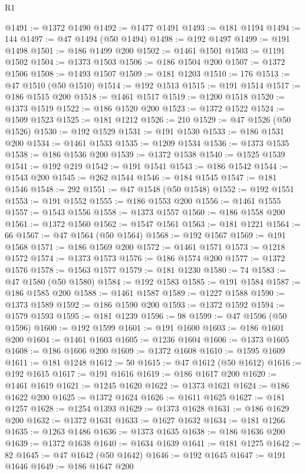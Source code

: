 \begin{lexlean}{R1}
\begin{coremodule}
@1491 := @1372 @1490
@1492 := @1477 @1491
@1493 := @181 @1194
@1494 := 144
@1497 := @47 @1494 (@50 @1494)
@1498 := @192 @1497
@1499 := @191 @1498
@1501 := @186 @1499 @200
@1502 := @1461 @1501
@1503 := @1191 @1502
@1504 := @1373 @1503
@1506 := @186 @1504 @200
@1507 := @1372 @1506
@1508 := @1493 @1507
@1509 := @181 @1203
@1510 := 176
@1513 := @47 @1510 (@50 @1510)
@1514 := @192 @1513
@1515 := @191 @1514
@1517 := @186 @1515 @200
@1518 := @1461 @1517
@1519 := @1200 @1518
@1520 := @1373 @1519
@1522 := @186 @1520 @200
@1523 := @1372 @1522
@1524 := @1509 @1523
@1525 := @181 @1212
@1526 := 210
@1529 := @47 @1526 (@50 @1526)
@1530 := @192 @1529
@1531 := @191 @1530
@1533 := @186 @1531 @200
@1534 := @1461 @1533
@1535 := @1209 @1534
@1536 := @1373 @1535
@1538 := @186 @1536 @200
@1539 := @1372 @1538
@1540 := @1525 @1539
@1541 := @192 @219
@1542 := @191 @1541
@1543 := @186 @1542
@1544 := @1543 @200
@1545 := @262 @1544
@1546 := @184 @1545
@1547 := @181 @1546
@1548 := 292
@1551 := @47 @1548 (@50 @1548)
@1552 := @192 @1551
@1553 := @191 @1552
@1555 := @186 @1553 @200
@1556 := @1461 @1555
@1557 := @1543 @1556
@1558 := @1373 @1557
@1560 := @186 @1558 @200
@1561 := @1372 @1560
@1562 := @1547 @1561
@1563 := @181 @1221
@1564 := 66
@1567 := @47 @1564 (@50 @1564)
@1568 := @192 @1567
@1569 := @191 @1568
@1571 := @186 @1569 @200
@1572 := @1461 @1571
@1573 := @1218 @1572
@1574 := @1373 @1573
@1576 := @186 @1574 @200
@1577 := @1372 @1576
@1578 := @1563 @1577
@1579 := @181 @1230
@1580 := 74
@1583 := @47 @1580 (@50 @1580)
@1584 := @192 @1583
@1585 := @191 @1584
@1587 := @186 @1585 @200
@1588 := @1461 @1587
@1589 := @1227 @1588
@1590 := @1373 @1589
@1592 := @186 @1590 @200
@1593 := @1372 @1592
@1594 := @1579 @1593
@1595 := @181 @1239
@1596 := 98
@1599 := @47 @1596 (@50 @1596)
@1600 := @192 @1599
@1601 := @191 @1600
@1603 := @186 @1601 @200
@1604 := @1461 @1603
@1605 := @1236 @1604
@1606 := @1373 @1605
@1608 := @186 @1606 @200
@1609 := @1372 @1608
@1610 := @1595 @1609
@1611 := @181 @1248
@1612 := 50
@1615 := @47 @1612 (@50 @1612)
@1616 := @192 @1615
@1617 := @191 @1616
@1619 := @186 @1617 @200
@1620 := @1461 @1619
@1621 := @1245 @1620
@1622 := @1373 @1621
@1624 := @186 @1622 @200
@1625 := @1372 @1624
@1626 := @1611 @1625
@1627 := @181 @1257
@1628 := @1254 @1393
@1629 := @1373 @1628
@1631 := @186 @1629 @200
@1632 := @1372 @1631
@1633 := @1627 @1632
@1634 := @181 @1266
@1635 := @1263 @1486
@1636 := @1373 @1635
@1638 := @186 @1636 @200
@1639 := @1372 @1638
@1640 := @1634 @1639
@1641 := @181 @1275
@1642 := 82
@1645 := @47 @1642 (@50 @1642)
@1646 := @192 @1645
@1647 := @191 @1646
@1649 := @186 @1647 @200

\end{coremodule}
\end{lexlean}
